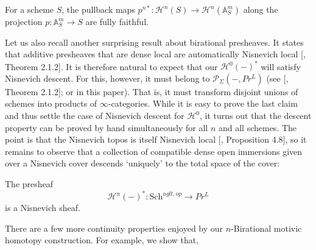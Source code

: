 \begin{inner-recall-star}
    For a scheme $S$, the pullback maps $p^{n*}: \mathcal{H}^{n}(S)\to \mathcal{H}^{n}(\mathbb{A}^m_S)$ along the projection $p:\mathbb{A}^m_S\to S$ are fully faithful.
\end{inner-recall-star}



Let us also recall another surprising result about birational presheaves. It states that additive presheaves that are dense local are automatically Nisnevich local [\cite{0bat}, Theorem 2.1.2]. It is therefore natural to expect that our $\mathcal{H}^{0}(-)^*$ will satisfy Nisnevich descent. For this, however, it must belong to $\mathcal{P}_\Sigma (-,Pr^L)$ (see [\cite{0bat}, Theorem 2.1.2]; or  in this paper). That is, it must transform disjoint unions of schemes into products of $\infty$-categories. While it is easy to prove the last claim and thus settle the case of Nisnevich descent for $\mathcal{H}^0$, it turns out that the descent property can be proved by hand simultaneously for all $n$ and all schemes. The point is that the Nisnevich topos is itself Nisnevich local [\cite{hoyois2017six}, Proposition 4.8], so it remains to observe that a collection of compatible dense open immersions given over a Nisnevich cover descends `uniquely' to the total space of the cover:
 \begin{inner-recall-star}
  The presheaf $$
\mathcal{H}^{n}(-)^*: \mathrm{Sch}^{uglt,op}\to Pr^L$$ is a Nisnevich sheaf.       
    \end{inner-recall-star}
There are a few more continuity properties enjoyed by our $n$-Birational motivic homotopy construction. For example, we show that,

